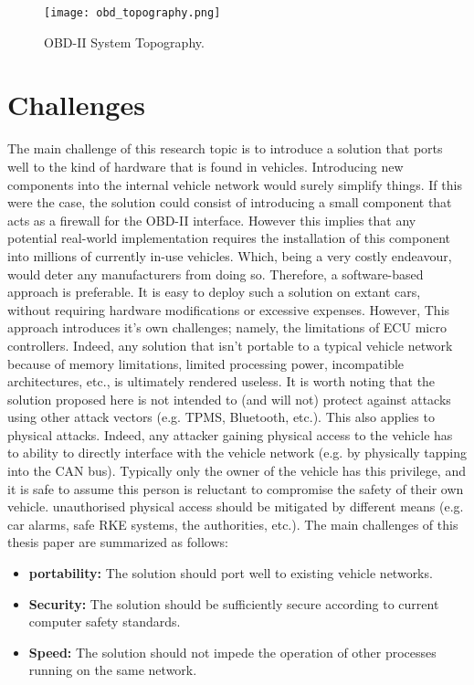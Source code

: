 \begin{figure}[h]
	\label{fig:topography}
	\centering
	\texttt{[image: obd\_topography.png]}
	\caption{OBD-II System Topography.}
\end{figure}
 

\section{Challenges} \label{sec:challenges}
The main challenge of this research topic is to introduce a solution that ports well to the kind of hardware that is found in vehicles. Introducing new components into the internal vehicle network would surely simplify things. If this were the case, the solution could consist of introducing a small component that acts as a firewall for the OBD-II interface. However this implies that any potential real-world implementation requires the installation of this component into millions of currently in-use vehicles. Which, being a very costly endeavour, would deter any manufacturers from doing so. Therefore, a software-based approach is preferable. It is easy to deploy such a solution on extant cars, without requiring hardware modifications or excessive expenses. However, This approach introduces it's own challenges; namely, the limitations of ECU micro controllers. Indeed, any solution that isn't portable to a typical vehicle network because of memory limitations, limited processing power, incompatible architectures, etc., is ultimately rendered useless. It is worth noting that the solution proposed here is not intended to (and will not) protect against attacks using other attack vectors (e.g. TPMS, Bluetooth, etc.). This also applies to physical attacks. Indeed, any attacker gaining physical access to the vehicle has to ability to directly interface with the vehicle network (e.g. by physically tapping into the CAN bus). Typically only the owner of the vehicle has this privilege, and it is safe to assume this person is reluctant to compromise the safety of their own vehicle. unauthorised physical access should be mitigated by different means (e.g. car alarms, safe RKE systems, the authorities, etc.). The main challenges of this thesis paper are summarized as follows:

\begin{itemize}
	\item \textbf{portability:} The solution should port well to existing vehicle networks. 
	\item \textbf{Security:} The solution should be sufficiently secure according to current computer safety standards. 
	\item \textbf{Speed:} The solution should not impede the operation of other processes running on the same network.
\end{itemize}


